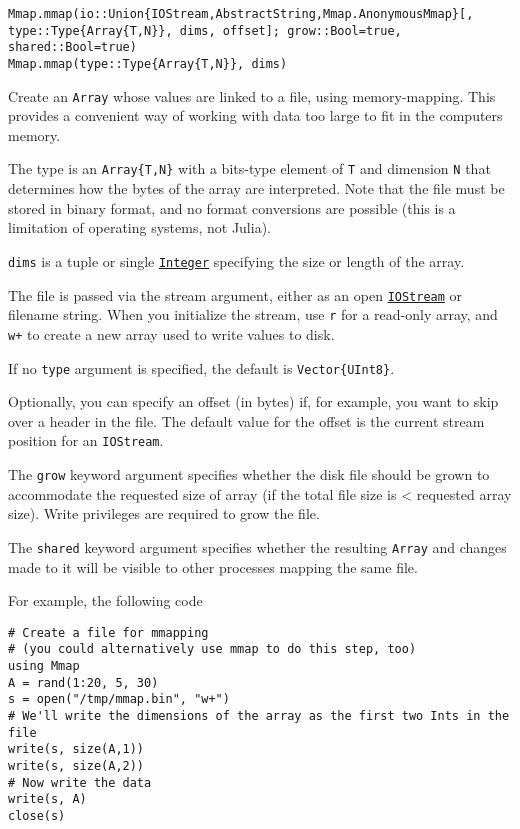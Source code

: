 \begin{adjustwidth}{2em}{0pt}


\begin{verbatim}
Mmap.mmap(io::Union{IOStream,AbstractString,Mmap.AnonymousMmap}[, type::Type{Array{T,N}}, dims, offset]; grow::Bool=true, shared::Bool=true)
Mmap.mmap(type::Type{Array{T,N}}, dims)
\end{verbatim}

Create an \texttt{Array} whose values are linked to a file, using memory-mapping. This provides a convenient way of working with data too large to fit in the computer{\textquotesingle}s memory.

The type is an \texttt{Array\{T,N\}} with a bits-type element of \texttt{T} and dimension \texttt{N} that determines how the bytes of the array are interpreted. Note that the file must be stored in binary format, and no format conversions are possible (this is a limitation of operating systems, not Julia).

\texttt{dims} is a tuple or single \hyperlink{8469131683393450448}{\texttt{Integer}} specifying the size or length of the array.

The file is passed via the stream argument, either as an open \hyperlink{12496894737220238417}{\texttt{IOStream}} or filename string. When you initialize the stream, use \texttt{{\textquotedbl}r{\textquotedbl}} for a {\textquotedbl}read-only{\textquotedbl} array, and \texttt{{\textquotedbl}w+{\textquotedbl}} to create a new array used to write values to disk.

If no \texttt{type} argument is specified, the default is \texttt{Vector\{UInt8\}}.

Optionally, you can specify an offset (in bytes) if, for example, you want to skip over a header in the file. The default value for the offset is the current stream position for an \texttt{IOStream}.

The \texttt{grow} keyword argument specifies whether the disk file should be grown to accommodate the requested size of array (if the total file size is < requested array size). Write privileges are required to grow the file.

The \texttt{shared} keyword argument specifies whether the resulting \texttt{Array} and changes made to it will be visible to other processes mapping the same file.

For example, the following code


\begin{verbatim}
# Create a file for mmapping
# (you could alternatively use mmap to do this step, too)
using Mmap
A = rand(1:20, 5, 30)
s = open("/tmp/mmap.bin", "w+")
# We'll write the dimensions of the array as the first two Ints in the file
write(s, size(A,1))
write(s, size(A,2))
# Now write the data
write(s, A)
close(s)


\end{verbatim}
\end{adjustwidth}
